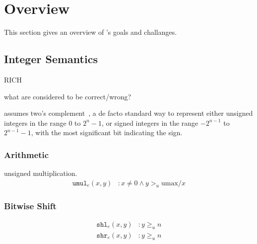 \section{Overview}
\label{s:oview}

This section gives an overview of \sys's goals and challanges.

\subsection{Integer Semantics}

\newcommand{\smin}{\mathrm{smin}}
\newcommand{\smax}{\mathrm{smax}}
\newcommand{\umax}{\mathrm{umax}}

\newcommand{\sadde}{\mathtt{sadd}_e}
\newcommand{\uadde}{\mathtt{uadd}_e}
\newcommand{\ssube}{\mathtt{ssub}_e}
\newcommand{\usube}{\mathtt{usub}_e}
\newcommand{\smule}{\mathtt{smul}_e}
\newcommand{\umule}{\mathtt{umul}_e}
\newcommand{\sdive}{\mathtt{sdiv}_e}
\newcommand{\udive}{\mathtt{udiv}_e}
\newcommand{\shle}{\mathtt{shl}_e}
\newcommand{\shre}{\mathtt{shr}_e}
\newcommand{\conve}{\mathtt{conv}_e}

RICH~\cite{brumley:rich}

what are considered to be correct/wrong?

\sys assumes two's complement~\cite{intel:int}, a de facto
standard way to represent either unsigned integers in the range $0$
to $2^n-1$, or signed integers in the range $-2^{n-1}$ to $2^{n-1}-1$,
with the most significant bit indicating the sign.

\subsubsection*{Arithmetic}

unsigned multiplication.
\begin{align}
\umule(x, y)&: x \neq 0 \land y >_u \umax / x
\end{align}



\subsubsection*{Bitwise Shift}

\begin{align}
\shle(x, y)&: y \geq_u n \\
\shre(x, y)&: y \geq_u n
\end{align}

